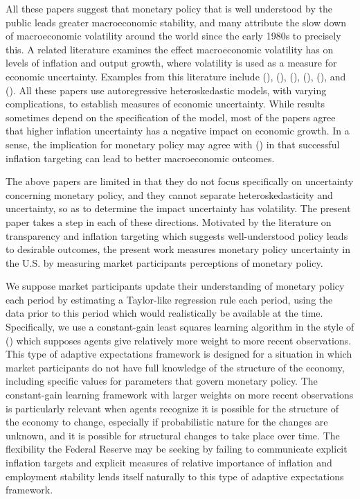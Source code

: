 \documentclass[12pt]{article}
\newcommand{\citee}[1]{\citename{#1} (\citeyear{#1})}
\begin{document}
All these papers suggest that monetary policy that is well understood by the public leads greater macroeconomic stability, and many attribute the slow down of macroeconomic volatility around the world since the early 1980s to precisely this.  A related literature examines the effect macroeconomic volatility has on levels of inflation and output growth, where volatility is used as a measure for economic uncertainty.  Examples from this literature include \citee{grier_perry2000}, \citee{fountas2001}, \citee{fountas2002}, \citee{grier2004}, \citee{fountas2006}, and \citee{fountas2007}.  All these papers use autoregressive heteroskedastic models, with varying complications, to establish measures of economic uncertainty.  While results sometimes depend on the specification of the model, most of the papers agree that higher inflation uncertainty has a negative impact on economic growth.  In a sense, the implication for monetary policy may agree with \citee{bernanke1997} in that successful inflation targeting can lead to better macroeconomic outcomes.

The above papers are limited in that they do not focus specifically on uncertainty concerning monetary policy, and they cannot separate heteroskedasticity and uncertainty, so as to determine the impact uncertainty has volatility.  The present paper takes a step in each of these directions.  Motivated by the literature on transparency and inflation targeting which suggests well-understood policy leads to desirable outcomes, the present work measures monetary policy uncertainty in the U.S. by measuring market participants perceptions of monetary policy.  

We suppose market participants update their understanding of monetary policy each period by estimating a Taylor-like regression rule each period, using the data prior to this period which would realistically be available at the time.  Specifically, we use a constant-gain least squares learning algorithm in the style of \citee{evanshonka2001} which supposes agents give relatively more weight to more recent observations.  This type of adaptive expectations framework is designed for a situation in which market participants do not have full knowledge of the structure of the economy, including specific values for parameters that govern monetary policy.  The constant-gain learning framework with larger weights on more recent observations is particularly relevant when agents recognize it is possible for the structure of the economy to change, especially if probabilistic nature for the changes are unknown, and it is possible for structural changes to take place over time.  The flexibility the Federal Reserve may be seeking by failing to communicate explicit inflation targets and explicit measures of relative importance of inflation and employment stability lends itself naturally to this type of adaptive expectations framework.
\end{document}
